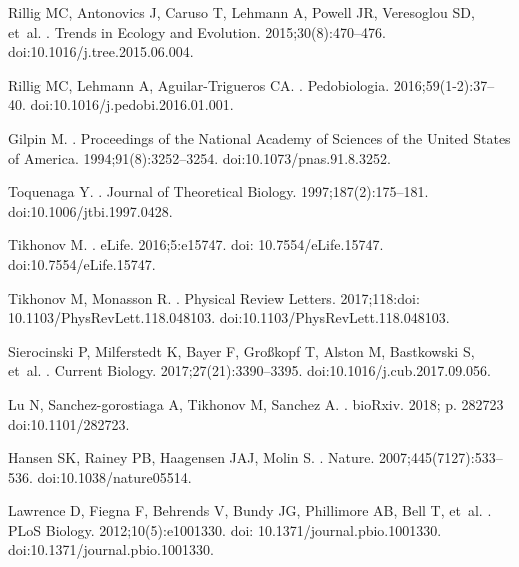 \documentclass[10pt,letterpaper]{article}
\begin{document}
\begin{thebibliography}{10}
Rillig MC, Antonovics J, Caruso T, Lehmann A, Powell JR, Veresoglou SD, et~al.
.
\newblock Trends in Ecology and Evolution. 2015;30(8):470--476.
\newblock doi:{10.1016/j.tree.2015.06.004}.

Rillig MC, Lehmann A, Aguilar-Trigueros CA.
.
\newblock Pedobiologia. 2016;59(1-2):37--40.
\newblock doi:{10.1016/j.pedobi.2016.01.001}.

Gilpin M.
.
\newblock Proceedings of the National Academy of Sciences of the United States
  of America. 1994;91(8):3252--3254.
\newblock doi:{10.1073/pnas.91.8.3252}.

Toquenaga Y.
.
\newblock Journal of Theoretical Biology. 1997;187(2):175--181.
\newblock doi:{10.1006/jtbi.1997.0428}.

Tikhonov M.
.
\newblock eLife. 2016;5:e15747. doi: 10.7554/eLife.15747.
\newblock doi:{10.7554/eLife.15747}.

Tikhonov M, Monasson R.
.
\newblock Physical Review Letters. 2017;118:doi:
  10.1103/PhysRevLett.118.048103.
\newblock doi:{10.1103/PhysRevLett.118.048103}.

Sierocinski P, Milferstedt K, Bayer F, Gro{\ss}kopf T, Alston M, Bastkowski S,
  et~al.
.
\newblock Current Biology. 2017;27(21):3390--3395.
\newblock doi:{10.1016/j.cub.2017.09.056}.

Lu N, Sanchez-gorostiaga A, Tikhonov M, Sanchez A.
.
\newblock bioRxiv. 2018; p. 282723
\newblock doi:{10.1101/282723}.

Hansen SK, Rainey PB, Haagensen JAJ, Molin S.
.
\newblock Nature. 2007;445(7127):533–536.
\newblock doi:{10.1038/nature05514}.

Lawrence D, Fiegna F, Behrends V, Bundy JG, Phillimore AB, Bell T, et~al.
.
\newblock PLoS Biology. 2012;10(5):e1001330. doi: 10.1371/journal.pbio.1001330.
\newblock doi:{10.1371/journal.pbio.1001330}.


\end{thebibliography}
\end{document}
